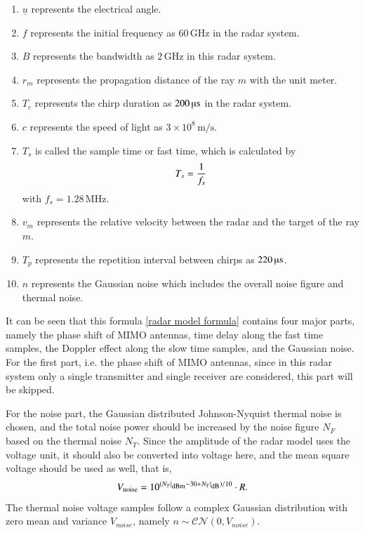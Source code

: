 \documentclass[12pt,DIV14,BCOR12mm,a4paper,footinclude=false,headinclude,parskip=half-,twoside,openright,cleardoublepage=empty,toc=index,bibliography=totoc,listof=totoc]{scrreprt}
\numberwithin{equation}{chapter}
\begin{document}
\begin{enumerate}[label=\textbullet]
    \item $\underline{u}$ represents the electrical angle.
    \item $f$ represents the initial frequency as $60\,\mathrm{GHz}$ in the radar system.
    \item $B$ represents the bandwidth as $2\,\mathrm{GHz}$ in this radar system.
    \item $r_m$ represents the propagation distance of the ray $m$ with the unit meter.
    \item $T_c$ represents the chirp duration as $200\,\text{\textmu s}$ in the radar system.
    \item $c$ represents the speed of light as $3\times 10^8\,\mathrm{m/s}$.
    \item $T_s$ is called the sample time or fast time, which is calculated by
        \begin{equation}
            \centering
            T_s = \frac{1}{f_s}
        \end{equation}
        with $f_s=1.28\,\mathrm{MHz}$.
    \item $v_m$ represents the relative velocity between the radar and the target of the ray $m$.
    \item $T_p$ represents the repetition interval between chirps as $220\,\text{\textmu s}$.
    \item $n$ represents the Gaussian noise which includes the overall noise figure and thermal noise.
    
\end{enumerate}

It can be seen that this formula \ref{radar model formula} contains four major parts, namely the phase shift of MIMO antennas, time delay along the fast time samples, the Doppler effect along the slow time samples, and the Gaussian noise. For the first part, i.e. the phase shift of MIMO antennas, since in this radar system only a single transmitter and single receiver are considered, this part will be skipped.

For the noise part, the Gaussian distributed Johnson-Nyquist thermal noise is chosen, and the total noise power should be increased by the noise figure $N_F$ based on the thermal noise $N_T$. Since the amplitude of the radar model uses the voltage unit, it should also be converted into voltage here, and the mean square voltage should be used as well, that is,
\begin{equation}
    \centering
    V_{\text{noise}} = 10^{(N_T \vert \textsubscript{dBm} -30 + N_T \vert \textsubscript{dB}) / 10} \cdot R.
\end{equation}
The thermal noise voltage samples follow a complex Gaussian distribution with zero mean and variance $V_{noise}$, namely $n \sim \mathcal{CN}(0, V_{noise})$.
\end{document}
